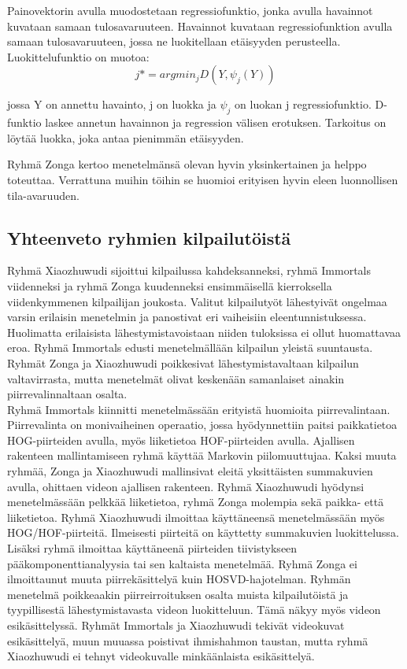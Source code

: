 Painovektorin avulla muodostetaan regressiofunktio, jonka avulla havainnot kuvataan samaan tulosavaruuteen. Havainnot kuvataan
regressiofunktion avulla samaan tulosavaruuteen, jossa ne luokitellaan etäisyyden perusteella. Luokittelufunktio on muotoa:
\begin{equation}
j*=argmin_{j}D(Y,\psi_{j}(Y))
\end{equation}

jossa Y on annettu havainto, j on luokka ja $\psi_{j}$ on luokan j regressiofunktio. D-funktio laskee annetun havainnon ja regression välisen erotuksen.
Tarkoitus on löytää luokka, joka antaa pienimmän etäisyyden. 

Ryhmä Zonga kertoo menetelmänsä olevan hyvin yksinkertainen ja helppo toteuttaa. 
Verrattuna muihin töihin se huomioi erityisen hyvin eleen luonnollisen tila-avaruuden.\citep{firstround} 

\subsection{Yhteenveto ryhmien kilpailutöistä}

Ryhmä Xiaozhuwudi sijoittui kilpailussa kahdeksanneksi, ryhmä Immortals viidenneksi ja ryhmä Zonga kuudenneksi ensimmäisellä kierroksella
viidenkymmenen kilpailijan joukosta. Valitut kilpailutyöt lähestyivät ongelmaa varsin erilaisin menetelmin ja panostivat eri vaiheisiin eleentunnistuksessa.
Huolimatta erilaisista lähestymistavoistaan niiden tuloksissa ei ollut huomattavaa eroa. Ryhmä Immortals edusti menetelmällään kilpailun yleistä suuntausta.
Ryhmät Zonga ja Xiaozhuwudi poikkesivat lähestymistavaltaan kilpailun valtavirrasta, mutta menetelmät olivat keskenään samanlaiset ainakin piirrevalinnaltaan
osalta.\\

Ryhmä Immortals kiinnitti menetelmässään erityistä huomioita piirrevalintaan. Piirrevalinta on monivaiheinen operaatio,
jossa hyödynnettiin paitsi paikkatietoa HOG-piirteiden avulla, myös liiketietoa HOF-piirteiden avulla.
Ajallisen rakenteen mallintamiseen ryhmä käyttää Markovin piilomuuttujaa. Kaksi muuta ryhmää,
Zonga ja Xiaozhuwudi mallinsivat eleitä yksittäisten summakuvien avulla, ohittaen videon ajallisen rakenteen.
Ryhmä Xiaozhuwudi hyödynsi menetelmässään pelkkää liiketietoa, ryhmä Zonga molempia sekä paikka- että liiketietoa.
Ryhmä Xiaozhuwudi ilmoittaa käyttäneensä menetelmässään myös HOG/HOF-piirteitä. Ilmeisesti piirteitä on käyttetty summakuvien luokittelussa.
Lisäksi ryhmä ilmoittaa käyttäneenä piirteiden tiivistykseen pääkomponenttianalyysia tai sen kaltaista menetelmää.
Ryhmä Zonga ei ilmoittaunut muuta piirrekäsittelyä kuin HOSVD-hajotelman. Ryhmän menetelmä poikkeaakin piirreirroituksen osalta
muista kilpailutöistä ja tyypillisestä lähestymistavasta videon luokitteluun. Tämä näkyy myös videon esikäsittelyssä. 
Ryhmät Immortals ja Xiaozhuwudi tekivät videokuvat esikäsittelyä, muun muuassa poistivat ihmishahmon taustan,
mutta ryhmä Xiaozhuwudi ei tehnyt videokuvalle minkäänlaista esikäsittelyä.\\

